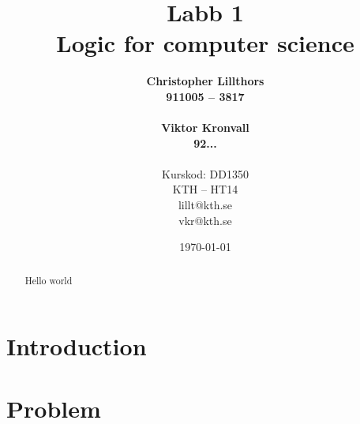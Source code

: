 \documentclass[a4paper,11pt]{article}
\title{Labb 1 \\ Logic for computer science}
\author{
  {\bf Christopher Lillthors}\\
  \textbf{911005 -- 3817} \\\\
  {\bf Viktor Kronvall}\\
  \textbf{92...}\\
  \\
  Kurskod: DD1350\\
  KTH -- HT14\\
  lillt@kth.se\\
  vkr@kth.se
}
\date{\today}
\begin{document}
\maketitle
\thispagestyle{empty}
\begin{abstract}
Hello world
\end{abstract}
\renewcommand{\arraystretch}{1.2}
\newpage
\thispagestyle{empty}
\tableofcontents
\newpage
\clearpage
\setcounter{page}{1}
\section{Introduction}

\section{Problem}
\end{document}
